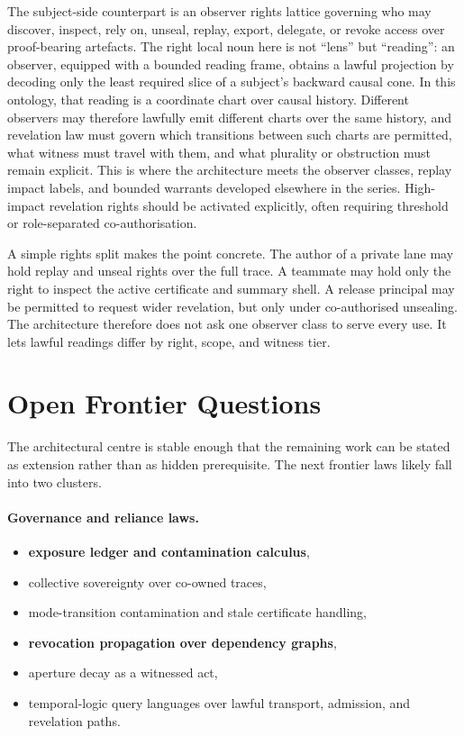 \documentclass{aion}
\begin{document}
The subject-side counterpart is an observer rights lattice governing who may
discover, inspect, rely on, unseal, replay, export, delegate, or revoke access
over proof-bearing artefacts. The right local noun here is not ``lens'' but
``reading'': an observer, equipped with a bounded reading frame, obtains a
lawful projection by decoding only the least required slice of a subject's
backward causal cone. In this ontology, that reading is a coordinate chart
over causal history. Different observers may therefore lawfully emit different
charts over the same history, and revelation law must govern which transitions
between such charts are permitted, what witness must travel with them, and what
plurality or obstruction must remain explicit. This is where the architecture
meets the observer classes, replay impact labels, and bounded warrants developed
elsewhere in the series.
High-impact revelation rights should be activated explicitly, often requiring
threshold or role-separated co-authorisation.

A simple rights split makes the point concrete. The author of a private lane may
hold replay and unseal rights over the full trace. A teammate may hold only the
right to inspect the active certificate and summary shell. A release principal
may be permitted to request wider revelation, but only under co-authorised
unsealing. The architecture therefore does not ask one observer class to serve
every use. It lets lawful readings differ by right, scope, and witness tier.

\clearpage
\section{Open Frontier Questions}
\label{sec:frontier}

The architectural centre is stable enough that the remaining work can be stated
as extension rather than as hidden prerequisite. The next frontier laws likely
fall into two clusters.

\paragraph{Governance and reliance laws.}
\begin{itemize}[leftmargin=*]
	\item \textbf{exposure ledger and contamination calculus},
	\item collective sovereignty over co-owned traces,
	\item mode-transition contamination and stale certificate handling,
	\item \textbf{revocation propagation over dependency graphs},
	\item aperture decay as a witnessed act,
	\item temporal-logic query languages over lawful transport, admission, and revelation paths.
\end{itemize}
\end{document}
